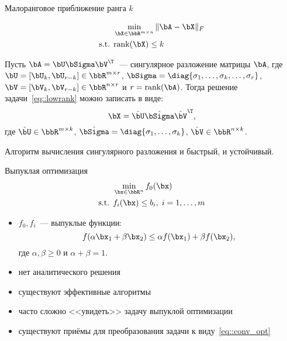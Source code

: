 \documentclass[12pt]{beamer}
\begin{document}
\begin{frame}{Малоранговое приближение ранга $k$}

\begin{equation*}
\begin{split}
&\min\limits_{\bX \in \bbR^{m \times n}} \|\bA - \bX \|_F \\
\text{s.t. } & \text{rank}(\bX) \leq k
\end{split}
\label{eq::lowrank}
\end{equation*}

\begin{Theorem}
Пусть $\bA = \bU\bSigma\bV^{\T}$~--- сингулярное разложение матрицы $\bA$, где $\bU = [\bU_k, \bU_{r-k}] \in \bbR^{m \times r}$, $\bSigma = \diag{\sigma_1, \ldots, \sigma_k, \ldots, \sigma_r}$, $\bV = [\bV_k, \bV_{r - k}] \in \bbR^{n \times r}$ и $r = \text{rank}(\bA)$.  Тогда решение задачи~\eqref{eq::lowrank} можно записать в виде:
\[
\bX = \hat{\bU} \hat{\bSigma} \hat{\bV}^{\T},
\]
где $\hat{\bU} \in \bbR^{m \times k}$, $\hat{\bSigma} = \diag{\sigma_1, \ldots, \sigma_k}$, $\hat{\bV} \in \bbR^{n \times k}$.
\end{Theorem}
\small Алгоритм вычисления сингулярного разложения и быстрый, и устойчивый.
\end{frame}

\begin{frame}{Выпуклая оптимизация}
\begin{equation*}
\begin{split}
&\min\limits_{\bx \in \bbR^n} f_0(\bx)\\
\text{s.t. } & f_i(\bx) \leq b_i, \; i = 1,\ldots, m
\end{split}
\label{eq::conv_opt}
\end{equation*}
\begin{itemize}
\item $f_0, f_i$~--- выпуклые функции:
\[
f(\alpha \bx_1 + \beta \bx_2) \leq \alpha f(\bx_1) + \beta f(\bx_2),
\]
где $\alpha, \beta \geq 0$ и $\alpha + \beta = 1$.
\item нет аналитического решения
\item существуют эффективные алгоритмы
\item часто сложно <<увидеть>> задачу выпуклой оптимизации
\item существуют приёмы для преобразования задачи к виду~\eqref{eq::conv_opt}
\end{itemize}
\end{frame}
\end{document}
